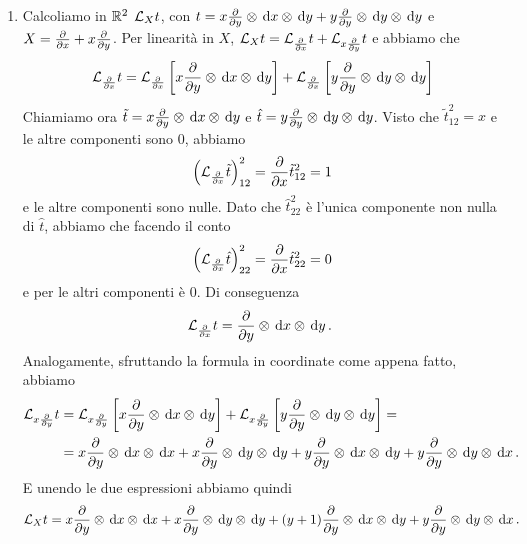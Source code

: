 \begin{example}
	\begin{enumerate} %
		\item Calcoliamo in $\mathbb R^2$ $\mathcal L_Xt$, con $t=x\frac{\partial }{\partial y}\otimes \,\mathrm d x \otimes \,\mathrm d y + y\frac{\partial }{\partial y} \otimes \,\mathrm d y \otimes \,\mathrm d y$ e $X = \frac{\partial }{\partial x} + x \frac{\partial }{\partial y}$.
		Per linearità in $X$, $\mathcal L_Xt = \mathcal L_{\frac{\partial }{\partial x}}t + \mathcal L_{x\frac{\partial }{\partial y}}t$ e abbiamo che
		\begin{equation*}
			\mathcal L_{\frac{\partial }{\partial x}} t = \mathcal L_{\frac{\partial }{\partial x}} \left[x \frac{\partial }{\partial y}\otimes \,\mathrm d x \otimes \,\mathrm d y\right] + \mathcal L_{\frac{\partial }{\partial x}} \left[y \frac{\partial }{\partial y}\otimes \,\mathrm d y \otimes \,\mathrm d y\right]
		\end{equation*}
		Chiamiamo ora $\tilde t = x\frac{\partial }{\partial y}\otimes \,\mathrm d x \otimes \,\mathrm d y$ e $\hat t = y\frac{\partial }{\partial y} \otimes \,\mathrm d y \otimes \,\mathrm d y$. Visto che $\tilde t_{12}^2 = x$ e le altre componenti sono 0, abbiamo
		\begin{equation*}
			\left(\mathcal L_{\frac{\partial }{\partial x}}\tilde t\right)_{12}^2 = \frac{\partial }{\partial x} \tilde t^2_{12}=1
		\end{equation*}
		e le altre componenti sono nulle. 
		Dato che $\hat t_{22}^2$ è l'unica componente non nulla di $\hat t$, abbiamo che facendo il conto
		\begin{equation*}
			\left(\mathcal L_{\frac{\partial }{\partial x}}\hat t\right)_{22}^2 = \frac{\partial }{\partial x}\hat t^2_{22} =  0
		\end{equation*}
		e per le altri componenti è 0. Di conseguenza
		\begin{equation*}
			\mathcal L_{\frac{\partial }{\partial x}} t = \frac{\partial }{\partial y} \otimes \,\mathrm d x \otimes \,\mathrm d y \, \text{. }
		\end{equation*}
		Analogamente, sfruttando la formula in coordinate come appena fatto, abbiamo
		\begin{align*}
			\mathcal L_{x\frac{\partial }{\partial y}} t &= \mathcal L_{x\frac{\partial }{\partial y}}\left[x \frac{\partial }{\partial y}\otimes \,\mathrm d x \otimes \,\mathrm d y\right] + \mathcal L_{x\frac{\partial }{\partial y}} \left[y \frac{\partial }{\partial y}\otimes \,\mathrm d y \otimes \,\mathrm d y\right] =\\
			&=x \frac{\partial }{\partial y} \otimes \,\mathrm d x \otimes \,\mathrm d x + x \frac{\partial }{\partial y} \otimes \,\mathrm d y \otimes \,\mathrm d y + y \frac{\partial }{\partial y} \otimes \,\mathrm d x \otimes \,\mathrm d y + y \frac{\partial }{\partial y} \otimes \,\mathrm d y \otimes \,\mathrm d x \, \text{. }
		\end{align*}
		E unendo le due espressioni abbiamo quindi
		\begin{equation*}
			\mathcal L_X t = x \frac{\partial }{\partial y} \otimes \,\mathrm d x \otimes \,\mathrm d x + x \frac{\partial }{\partial y} \otimes \,\mathrm d y \otimes \,\mathrm d y + (y+1) \frac{\partial }{\partial y} \otimes \,\mathrm d x \otimes \,\mathrm d y + y \frac{\partial }{\partial y} \otimes \,\mathrm d y \otimes \,\mathrm d x \, \text{. }
		\end{equation*}


\end{enumerate}
\end{example}
